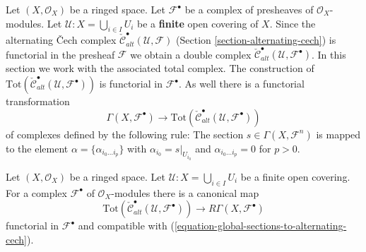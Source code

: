 \medskip\noindent
Let $(X, \mathcal{O}_X)$ be a ringed space.
Let ${\mathcal F}^\bullet$ be a complex of presheaves of
$\mathcal{O}_X$-modules. Let ${\mathcal U} : X = \bigcup_{i \in I} U_i$
be a {\bf finite} open covering of $X$. Since the alternating
{\v C}ech complex
$\check{\mathcal{C}}_{alt}^\bullet(\mathcal{U}, \mathcal{F})$
(Section \ref{section-alternating-cech})
is functorial in the presheaf $\mathcal{F}$ we obtain a double complex
$\check{\mathcal{C}}^\bullet_{alt}(\mathcal{U}, \mathcal{F}^\bullet)$.
In this section we work with the associated total complex.
The construction of
$\text{Tot}(\check{\mathcal{C}}^\bullet_{alt}({\mathcal U},
{\mathcal F}^\bullet))$
is functorial in ${\mathcal F}^\bullet$. As well there is a functorial
transformation
\begin{equation}
\label{equation-global-sections-to-alternating-cech}
\Gamma(X, {\mathcal F}^\bullet)
\longrightarrow
\text{Tot}(\check{\mathcal{C}}^\bullet_{alt}({\mathcal U},
{\mathcal F}^\bullet))
\end{equation}
of complexes defined by the following rule: The section
$s\in \Gamma(X, {\mathcal F}^n)$
is mapped to the element $\alpha = \{\alpha_{i_0\ldots i_p}\}$
with $\alpha_{i_0} = s|_{U_{i_0}}$ and $\alpha_{i_0\ldots i_p} = 0$
for $p > 0$.

\begin{lemma}
\label{lemma-alternating-cech-complex-complex}
Let $(X, \mathcal{O}_X)$ be a ringed space.
Let $\mathcal{U} : X = \bigcup_{i \in I} U_i$ be
a finite open covering. For a complex $\mathcal{F}^\bullet$
of $\mathcal{O}_X$-modules there is a canonical map
$$
\text{Tot}(\check{\mathcal{C}}^\bullet_{alt}(\mathcal{U}, \mathcal{F}^\bullet))
\longrightarrow
R\Gamma(X, \mathcal{F}^\bullet)
$$
functorial in $\mathcal{F}^\bullet$ and compatible with
(\ref{equation-global-sections-to-alternating-cech}).
\end{lemma}

